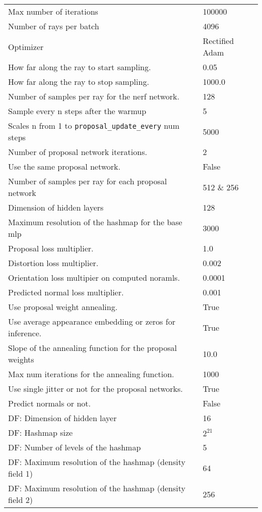 \begin{longtable}{|l|l|}
\hline
\endlastfoot
Max number of iterations & 100000 \\
Number of rays per batch & 4096 \\
Optimizer & Rectified Adam \\
How far along the ray to start sampling.                & 0.05 \\
How far along the ray to stop sampling.                 & 1000.0 \\
Number of samples per ray for the nerf network.         & 128 \\
Sample every n steps after the warmup                   & 5 \\
Scales n from 1 to \texttt{proposal\_update\_every} num steps & 5000 \\
Number of proposal network iterations.                  & 2 \\
Use the same proposal network. & False \\
Number of samples per ray for each proposal network & 512 \& 256 \\
Dimension of hidden layers & 128 \\
Maximum resolution of the hashmap for the base \acrshort{mlp} & 3000 \\
Proposal loss multiplier.                               & 1.0 \\
Distortion loss multiplier.                             & 0.002 \\
Orientation loss multipier on computed noramls.         & 0.0001 \\
Predicted normal loss multiplier.                       & 0.001 \\
Use proposal weight annealing.               & True \\
Use average appearance embedding or zeros for inference. & True \\
Slope of the annealing function for the proposal weights & 10.0 \\
Max num iterations for the annealing function.          & 1000 \\
Use single jitter or not for the proposal networks. & True \\
Predict normals or not.                      & False \\
DF: Dimension of hidden layer           & 16 \\
DF: Hashmap size                        & $2^{21}$ \\
DF: Number of levels of the hashmap     & 5 \\
DF: Maximum resolution of the hashmap (density field 1)         & 64 \\
DF: Maximum resolution of the hashmap (density field 2)         & 256 \\
\end{longtable}


